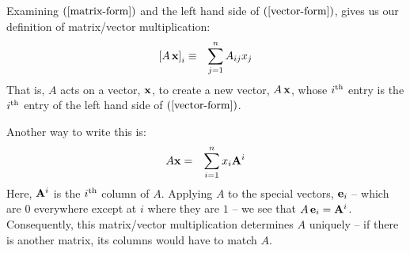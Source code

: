 \documentclass{article}
\begin{document}
Examining $(\ref{matrix-form})$ and the left hand side of
$(\ref{vector-form})$, gives us our definition of matrix/vector multiplication:
\begin{eqnarray}
  \left[A \, {\bf x}\right]_i & \equiv & \sum_{j=1}^n A_{ij} x_j
                                         \label{matrix-vector-mult}
\end{eqnarray}
That is, $A$ acts on a vector, ${\bf x}$, to create a new vector, $A \, {\bf x}$,
whose $i^{\rm th}$ entry is the $i^{\rm th}$ entry of
the left hand side of $(\ref{vector-form})$.

Another way to write this is:
\begin{eqnarray}
  A {\bf x} & = & \sum_{i=1}^n x_i {\bf A}^i
\end{eqnarray}
Here, ${\bf A}^i$ is the $i^{\rm th}$ column of $A$. Applying $A$ to the special
vectors, ${\bf e}_i$
-- which are $0$ everywhere except at $i$ where they are $1$ --
we see that $A \, {\bf e}_i = {\bf A}^i$. Consequently, this matrix/vector
multiplication determines $A$ uniquely
-- if there is another matrix, its columns would have to match $A$.
\end{document}

